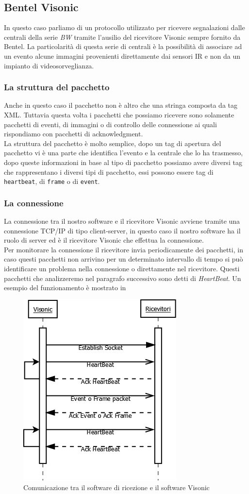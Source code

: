 \subsection{Bentel Visonic}
In questo caso parliamo  di un protocollo utilizzato per ricevere segnalazioni dalle centrali della serie \emph{BW} tramite l'ausilio del ricevitore Visonic sempre fornito da Bentel. La particolarità di questa serie di centrali è la possibilità di associare ad un evento alcune immagini provenienti direttamente dai sensori IR e non da un impianto di videosorveglianza.
\subsubsection{La struttura del pacchetto}
Anche in questo caso il pacchetto non è altro che una stringa composta da tag XML. Tuttavia questa volta i pacchetti che possiamo ricevere sono solamente pacchetti di eventi, di immagini o di controllo delle connessione ai quali rispondiamo con pacchetti di acknowledgment.\\
La struttura del pacchetto è molto semplice, dopo un tag di apertura del pacchetto vi è una parte che identifica l'evento e la centrale che lo ha trasmesso, dopo queste informazioni in base al tipo di pacchetto possiamo avere diversi tag che rappresentano i diversi tipi di pacchetto, essi possono essere tag di \texttt{heartbeat}, di \texttt{frame} o di \texttt{event}.
\subsubsection{La connessione}
La connessione tra il nostro software e il ricevitore Visonic avviene tramite una connessione TCP/IP di tipo client-server, in questo caso il nostro software ha il ruolo di server ed è il ricevitore Visonic che effettua la connessione.\\
Per monitorare la connessione il ricevitore invia periodicamente dei pacchetti, in caso questi pacchetti non arrivino per un determinato intervallo di tempo si può identificare un problema nella connessione o direttamente nel ricevitore. Questi pacchetti che analizzeremo nel paragrafo successivo sono detti di \emph{HeartBeat}. Un esempio del funzionamento è mostrato in 
\begin{figure}
	\centering
	\includegraphics[width=0.5\linewidth]{pictures/convisonic.png}
	\caption{Comunicazione tra il software di ricezione e il software Visonic}\label{fig:convisonic}
\end{figure}
